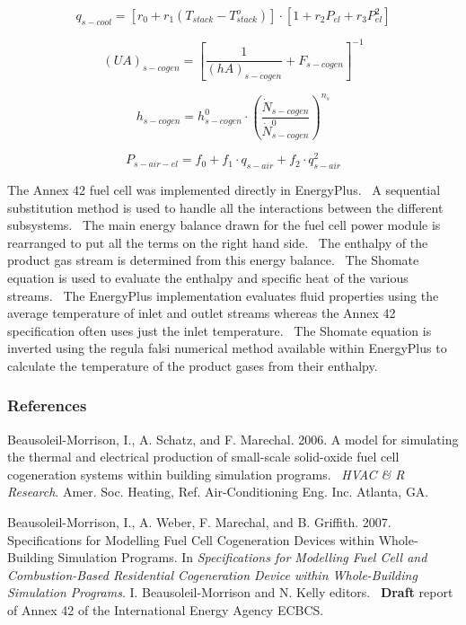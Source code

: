 \begin{equation}
{q_{s - cool}} = \left[ {{r_0} + {r_1}\left( {{T_{stack}} - T_{stack}^o} \right)} \right] \cdot \left[ {1 + {r_2}{P_{el}} + {r_3}P_{el}^2} \right]
\end{equation}

\begin{equation}
{\left( {UA} \right)_{s - cogen}} = {\left[ {\frac{1}{{{{\left( {hA} \right)}_{s - cogen}}}} + {F_{s - cogen}}} \right]^{ - 1}}
\end{equation}

\begin{equation}
{h_{s - cogen}} = h_{s - cogen}^0 \cdot {\left( {\frac{{{{\dot N}_{s - cogen}}}}{{\dot N_{s - cogen}^0}}} \right)^{{n_s}}}
\end{equation}

\begin{equation}
{P_{s - air - el}} = {f_0} + {f_1} \cdot {q_{s - air}} + {f_2} \cdot q_{s - air}^2
\end{equation}

The Annex 42 fuel cell was implemented directly in EnergyPlus.~ A sequential substitution method is used to handle all the interactions between the different subsystems.~ The main energy balance drawn for the fuel cell power module is rearranged to put all the terms on the right hand side.~ The enthalpy of the product gas stream is determined from this energy balance.~ The Shomate equation is used to evaluate the enthalpy and specific heat of the various streams.~ The EnergyPlus implementation evaluates fluid properties using the average temperature of inlet and outlet streams whereas the Annex 42 specification often uses just the inlet temperature.~ The Shomate equation is inverted using the regula falsi numerical method available within EnergyPlus to calculate the temperature of the product gases from their enthalpy.

\subsubsection{References}\label{references-1-009}

Beausoleil-Morrison, I., A. Schatz, and F. Marechal. 2006. A model for simulating the thermal and electrical production of small-scale solid-oxide fuel cell cogeneration systems within building simulation programs.~ \emph{HVAC \& R Research}. Amer. Soc. Heating, Ref. Air-Conditioning Eng. Inc. Atlanta, GA.

Beausoleil-Morrison, I., A. Weber, F. Marechal, and B. Griffith. 2007. Specifications for Modelling Fuel Cell Cogeneration Devices within Whole-Building Simulation Programs. In \emph{Specifications for Modelling Fuel Cell and Combustion-Based Residential Cogeneration Device within Whole-Building Simulation Programs}. I. Beausoleil-Morrison and N. Kelly editors.~ \textbf{Draft} report of Annex 42 of the International Energy Agency ECBCS.

